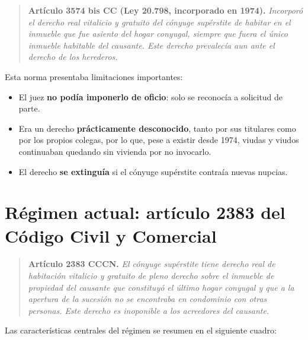 \documentclass[12pt,oneside]{book}
\begin{document}
\begin{quote}
\textbf{Artículo 3574 bis CC (Ley 20.798, incorporado en 1974).} \textit{Incorporó el derecho real vitalicio y gratuito del cónyuge supérstite de habitar en el inmueble que fue asiento del hogar conyugal, siempre que fuera el único inmueble habitable del causante. Este derecho prevalecía aun ante el derecho de los herederos.}
\end{quote}

Esta norma presentaba limitaciones importantes:

\begin{itemize}
    \item El juez \textbf{no podía imponerlo de oficio}: solo se reconocía a solicitud de parte.
    \item Era un derecho \textbf{prácticamente desconocido}, tanto por sus titulares como por los propios colegas, por lo que, pese a existir desde 1974, viudas y viudos continuaban quedando sin vivienda por no invocarlo.
    \item El derecho \textbf{se extinguía} si el cónyuge supérstite contraía nuevas nupcias.
\end{itemize}

\section{Régimen actual: artículo 2383 del Código Civil y Comercial}

\begin{quote}
\textbf{Artículo 2383 CCCN.} \textit{El cónyuge supérstite tiene derecho real de habitación vitalicio y gratuito de pleno derecho sobre el inmueble de propiedad del causante que constituyó el último hogar conyugal y que a la apertura de la sucesión no se encontraba en condominio con otras personas. Este derecho es inoponible a los acreedores del causante.}
\end{quote}

Las características centrales del régimen se resumen en el siguiente cuadro:
\end{document}
